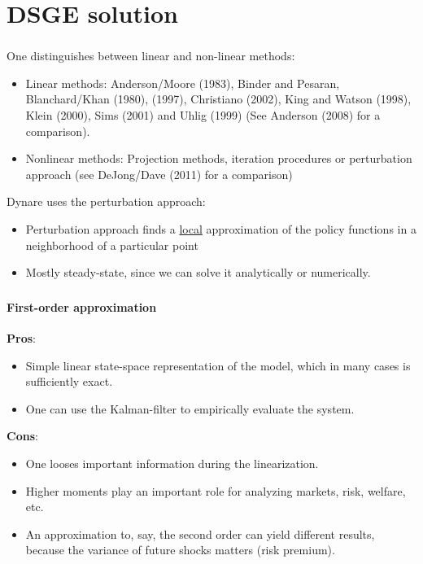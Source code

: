 \documentclass[handout]{beamer}  %
\begin{document}
\section{DSGE solution}
\begin{frame}
	\frametitle{\secname}
	One distinguishes between linear and non-linear methods:
	\begin{itemize}
		\item Linear methods: Anderson/Moore (1983), Binder and Pesaran, Blanchard/Khan (1980),
		(1997), Christiano (2002), King and Watson (1998), Klein (2000), Sims (2001) and Uhlig (1999) (See Anderson (2008) for a comparison).
		\item Nonlinear methods: Projection methods, iteration procedures or perturbation approach (see DeJong/Dave (2011) for a comparison)
	\end{itemize}
	Dynare uses the perturbation approach:
	\begin{itemize}
		\item Perturbation approach finds a \underline{local} approximation of the policy functions in a neighborhood of a particular point
		\item Mostly steady-state, since we can solve it analytically or numerically.
	\end{itemize}
\end{frame}

\begin{frame}
	\frametitle{\secname}\framesubtitle{First-order approximation}
	\textbf{Pros}:
	\begin{itemize}
		\item Simple linear state-space representation of the model, which in many cases is sufficiently exact.
		\item One can use the Kalman-filter to empirically evaluate the system.
	\end{itemize}
	\textbf{Cons}:
	\begin{itemize}
		\item One looses important information during the linearization.
		\item Higher moments play an important role for analyzing markets, risk, welfare, etc.
		\item An approximation to, say, the second order can yield different results, because the variance of future shocks matters (risk premium).
	\end{itemize}
	
\end{frame}
\end{document}
